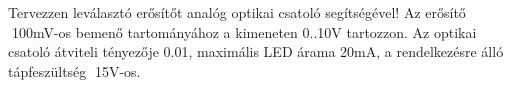 \begin{example}

Tervezzen leválasztó erősítőt analóg optikai csatoló segítségével! Az erősítő 100mV-os bemenő tartományához a kimeneten 0..10V tartozzon.
Az optikai csatoló átviteli tényezője 0.01, maximális LED árama 20mA, a rendelkezésre álló tápfeszültség 15V-os.


\tcbline
\vspace{1mm}

\solution

\end{example}